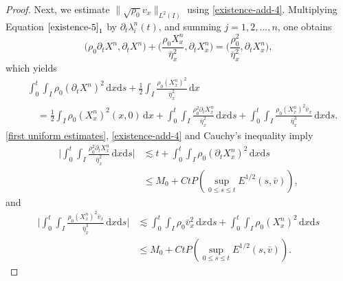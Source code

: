 \documentclass[11pt, reqno]{amsart}
\newcommand{\diff}{\mathrm{d}}
\numberwithin{equation}{section}
\begin{document}
{\begin{proof}
\bigskip
{} Next, we estimate \(\|\sqrt{\rho_0}v_x\|_{L^2(I)}\) using \eqref{existence-add-4}.
Multiplying Equation \(\eqref{existence-5}_1\) by \(\partial_t\lambda_i^n(t)\), and summing \(j=1,2,...,n\), one obtains
\begin{equation*}
		\big(\rho_0\partial_tX^n,\partial_tX^n\big)
		+\bigg(\frac{\rho_0X_x^n}{\bar{\eta}_x^2},\partial_tX_x^n\bigg)
		=\bigg(\frac{\rho_0^2}{\bar{\eta}_x^2},\partial_tX_x^n\bigg),
\end{equation*}
which yields 
\begin{equation}\label{existence-add-6}
\begin{aligned}
&\int_0^t\int_I \rho_0(\partial_tX^n)^2\,\diff x\diff s
+\frac{1}{2}\int_I\frac{\rho_0(X_x^n)^2}{\bar{\eta}_x^2}\,\diff x\\
&\quad=\frac{1}{2}\int_I\rho_0(X_x^n)^2(x,0)\,\diff x+\int_0^t\int_I{\frac{\rho_0^2\partial_tX_x^n}{\bar{\eta}_x^2}}\,\diff x\diff s
+\int_0^t\int_I\frac{\rho_0(X_x^n)^2\bar{v}_x}{\bar{\eta}_x^3}\,\diff x\diff s. 
\end{aligned}
\end{equation}
\eqref{first uniform estimates}, \eqref{existence-add-4} and Cauchy's inequality imply
\begin{equation}\label{existence-add-6.1}
	\begin{aligned}
		\bigg|\int_0^t\int_I\frac{\rho_0^2\partial_tX_x^n}{\bar{\eta}_x^2}\,\diff x\diff s\bigg|
		&\lesssim t+\int_0^t\int_I\rho_0(\partial_tX_x^n)^2\,\diff x\diff s\\
&\leq M_0+Ct P(\sup_{0\leq s\leq t}E^{1/2}(s,\bar{v})),
	\end{aligned}
\end{equation}
and
\begin{equation}\label{existence-add-6.2}
	\begin{aligned}
		\bigg|\int_0^t\int_I\frac{\rho_0(X_x^n)^2\bar{v}_x}{\bar{\eta}_x^3}\,\diff x\diff s\bigg|
		&\lesssim \int_0^t\int_I\rho_0\bar{v}_x^2\,\diff x\diff s+\int_0^t\int_I\rho_0(X_x^n)^2\,\diff x\diff s\\
&\leq M_0+Ct P(\sup_{0\leq s\leq t}E^{1/2}(s,\bar{v})).
	\end{aligned}
\end{equation}


\end{proof}}
\end{document}
